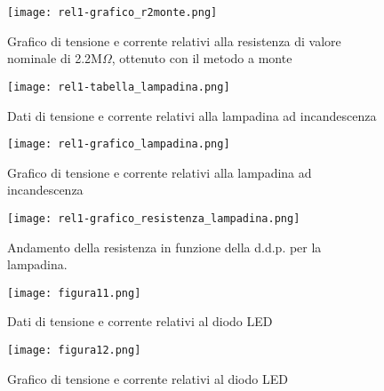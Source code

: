 \documentclass{article}
\begin{document}
\begin{figure}
    \centering
    \texttt{[image: rel1-grafico\_r2monte.png]}
    \caption{Grafico di tensione e corrente relativi alla resistenza di valore nominale
di 2.2M$\Omega$, ottenuto con il metodo a monte}
    \label{figura8}
\end{figure}
\begin{figure}
    \centering
    \texttt{[image: rel1-tabella\_lampadina.png]}
    \caption{Dati di tensione e corrente relativi alla lampadina ad incandescenza}
    \label{figura9}
\end{figure}
\begin{figure}
    \centering
    \texttt{[image: rel1-grafico\_lampadina.png]}
    \caption{Grafico di tensione e corrente relativi alla lampadina ad incandescenza}
    \label{figura10}
\end{figure}
\begin{figure}
    \centering
    \texttt{[image: rel1-grafico\_resistenza\_lampadina.png]}
    \caption{Andamento della resistenza in funzione della d.d.p. per la lampadina.}
    \label{figura11}
\end{figure}
\begin{figure}
    \centering
    \texttt{[image: figura11.png]}
    \caption{Dati di tensione e corrente relativi al diodo LED}
    \label{figura12}
\end{figure}
\begin{figure}
    \centering
    \texttt{[image: figura12.png]}
    \caption{Grafico di tensione e corrente relativi al diodo LED}
    \label{figura13}
\end{figure}
\end{document}

